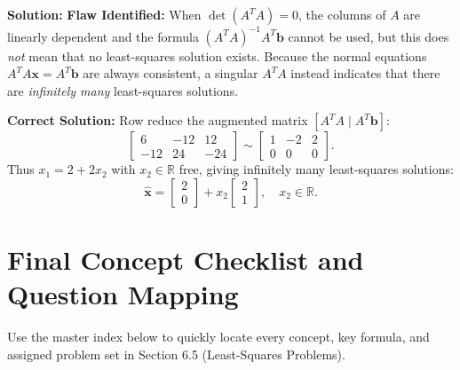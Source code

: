 \documentclass[11pt, letterpaper]{article}
\theoremstyle{definition}
\theoremstyle{remark}
\begin{document}
\textbf{Solution:}
\textbf{Flaw Identified:} When $\det(A^T A) = 0$, the columns of $A$ are linearly dependent and the formula $(A^T A)^{-1} A^T \mathbf{b}$ cannot be used, but this does \emph{not} mean that no least-squares solution exists. Because the normal equations $A^T A \mathbf{x} = A^T \mathbf{b}$ are always consistent, a singular $A^T A$ instead indicates that there are \emph{infinitely many} least-squares solutions.

\textbf{Correct Solution:} Row reduce the augmented matrix $[A^T A \mid A^T \mathbf{b}]$:
\[
\left[\begin{array}{cc|c} 6 & -12 & 12 \\ -12 & 24 & -24 \end{array}\right] \sim \left[\begin{array}{cc|c} 1 & -2 & 2 \\ 0 & 0 & 0 \end{array}\right].
\]
Thus $x_1 = 2 + 2x_2$ with $x_2 \in \mathbb{R}$ free, giving infinitely many least-squares solutions:
\[
\hat{\mathbf{x}} = \begin{bmatrix} 2 \\ 0 \end{bmatrix} + x_2 \begin{bmatrix} 2 \\ 1 \end{bmatrix}, \quad x_2 \in \mathbb{R}.
\]

\newpage

\section{Final Concept Checklist and Question Mapping}

Use the master index below to quickly locate every concept, key formula, and assigned problem set in Section 6.5 (Least-Squares Problems).
\end{document}
